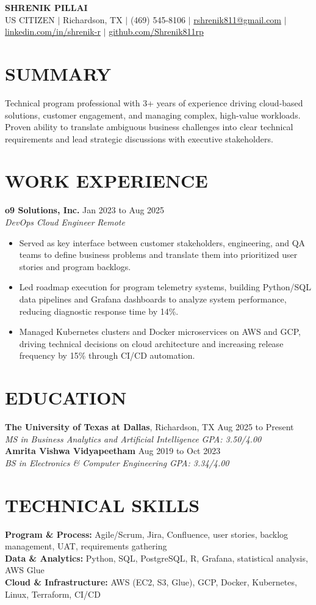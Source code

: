 \documentclass[11pt,letterpaper]{article}
\begin{document}
\begin{center}
{\LARGE \textbf{SHRENIK PILLAI}} \\
\small US CITIZEN $|$ Richardson, TX $|$ (469) 545-8106 $|$ \href{mailto:rshrenik811@gmail.com}{rshrenik811@gmail.com} $|$ \href{https://linkedin.com/in/shrenik-r}{linkedin.com/in/shrenik-r} $|$ \href{https://github.com/Shrenik811rp}{github.com/Shrenik811rp}
\end{center}
\section*{SUMMARY}
\noindent\small Technical program professional with 3+ years of experience driving cloud-based solutions, customer engagement, and managing complex, high-value workloads. Proven ability to translate ambiguous business challenges into clear technical requirements and lead strategic discussions with executive stakeholders.
\section*{WORK EXPERIENCE}
\noindent\small \textbf{o9 Solutions, Inc.} \hfill Jan 2023 to Aug 2025 \\
\textit{DevOps Cloud Engineer} \hfill \textit{Remote}
\begin{itemize}
\item Served as key interface between customer stakeholders, engineering, and QA teams to define business problems and translate them into prioritized user stories and program backlogs.
\item Led roadmap execution for program telemetry systems, building Python/SQL data pipelines and Grafana dashboards to analyze system performance, reducing diagnostic response time by 14\%.
\item Managed Kubernetes clusters and Docker microservices on AWS and GCP, driving technical decisions on cloud architecture and increasing release frequency by 15\% through CI/CD automation.
\end{itemize}
\section*{EDUCATION}
\noindent\small \textbf{The University of Texas at Dallas}, Richardson, TX \hfill Aug 2025 to Present \\
\textit{MS in Business Analytics and Artificial Intelligence} \hfill \textit{GPA: 3.50/4.00} \\
\noindent\small \textbf{Amrita Vishwa Vidyapeetham} \hfill Aug 2019 to Oct 2023 \\
\textit{BS in Electronics \& Computer Engineering} \hfill \textit{GPA: 3.34/4.00}
\section*{TECHNICAL SKILLS}
\noindent\small \textbf{Program \& Process:} Agile/Scrum, Jira, Confluence, user stories, backlog management, UAT, requirements gathering \\
\textbf{Data \& Analytics:} Python, SQL, PostgreSQL, R, Grafana, statistical analysis, AWS Glue \\
\textbf{Cloud \& Infrastructure:} AWS (EC2, S3, Glue), GCP, Docker, Kubernetes, Linux, Terraform, CI/CD
\end{document}
